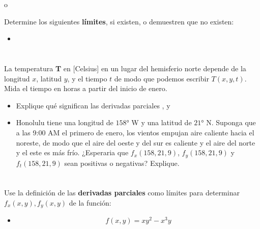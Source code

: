o\documentclass[12pt]{article}
\begin{document}
Determine los siguientes \textbf{límites}, si existen, o demuestren que no existen:

\begin{itemize}[format=\textbf]

\item

\end{itemize}

\section{}

La temperatura \textbf{T} en [Celsius] en un lugar del hemisferio norte depende de la longitud $x$, latitud $y$, y el tiempo $t$ de modo que podemos escribir $T(x, y, t)$. Mida el tiempo en horas a partir del inicio de enero.

\begin{itemize}[format=\textbf]

\item Explique qué significan las derivadas parciales , y 

\item Honolulu tiene una longitud de $158°$ W y una latitud de $21°$ N. Suponga que a las 9:00 AM el primero de enero, los vientos empujan aire caliente hacia el noreste, de modo que el aire del oeste y del sur es caliente y el aire del norte y el este es más frío. ¿Esperaria que $f_x(158, 21, 9)$, $f_y(158, 21, 9)$ y $f_t(158, 21, 9)$ sean positivas o
negativas? Explique.

\end{itemize}

\section{}

Use la definición de las \textbf{derivadas parciales} como límites para determinar $f_x(x, y), f_y(x, y)$ de la función:

\begin{itemize}[format=\textbf]

\item $$f(x, y) = xy^2 − x^3y$$

\end{itemize}
\end{document}
